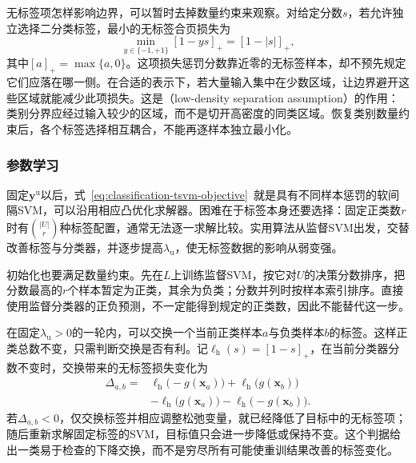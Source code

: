 无标签项怎样影响边界，可以暂时去掉数量约束来观察。对给定分数$s$，若允许独立选择二分类标签，最小的无标签合页损失为
\begin{equation}
  \label{eq:classification-tsvm-unlabeled-hinge}
  \min_{y\in\{-1,+1\}}[1-ys]_+=[1-|s|]_+,
\end{equation}
其中$[a]_+=\max\{a,0\}$。这项损失惩罚分数靠近零的无标签样本，却不预先规定它们应落在哪一侧。在合适的表示下，若大量输入集中在少数区域，让边界避开这些区域就能减少此项损失。这是（low-density separation assumption）的作用：类别分界应经过输入较少的区域，而不是切开高密度的同类区域。恢复类别数量约束后，各个标签选择相互耦合，不能再逐样本独立最小化。

\subsubsection{参数学习}
\label{sec:classification-tsvm-learning}

固定$\bm{y}^{\mathrm{u}}$以后，式~\eqref{eq:classification-tsvm-objective}~就是具有不同样本惩罚的软间隔SVM，可以沿用相应凸优化求解器。困难在于标签本身还要选择：固定正类数$r$时有$\binom{|U|}{r}$种标签配置，通常无法逐一求解比较。实用算法从监督SVM出发，交替改善标签与分类器，并逐步提高$\lambda_{\mathrm{u}}$，使无标签数据的影响从弱变强。

初始化也要满足数量约束。先在$L$上训练监督SVM，按它对$U$的决策分数排序，把分数最高的$r$个样本暂定为正类，其余为负类；分数并列时按样本索引排序。直接使用监督分类器的正负预测，不一定能得到规定的正类数，因此不能替代这一步。

在固定$\lambda_{\mathrm{u}}>0$的一轮内，可以交换一个当前正类样本$a$与负类样本$b$的标签。这样正类总数不变，只需判断交换是否有利。记$\ell_{\mathrm{h}}(s)=[1-s]_+$，在当前分类器分数不变时，交换带来的无标签损失变化为
\begin{equation}
  \label{eq:classification-tsvm-swap}
  \begin{aligned}
    \Delta_{a,b}
      ={}&\ell_{\mathrm{h}}\bigl(-g(\bm{x}_a)\bigr)
          +\ell_{\mathrm{h}}\bigl(g(\bm{x}_b)\bigr)\\
       &-\ell_{\mathrm{h}}\bigl(g(\bm{x}_a)\bigr)
          -\ell_{\mathrm{h}}\bigl(-g(\bm{x}_b)\bigr).
  \end{aligned}
\end{equation}
若$\Delta_{a,b}<0$，仅交换标签并相应调整松弛变量，就已经降低了目标中的无标签项；随后重新求解固定标签的SVM，目标值只会进一步降低或保持不变。这个判据给出一类易于检查的下降交换，而不是穷尽所有可能使重训结果改善的标签变化。

